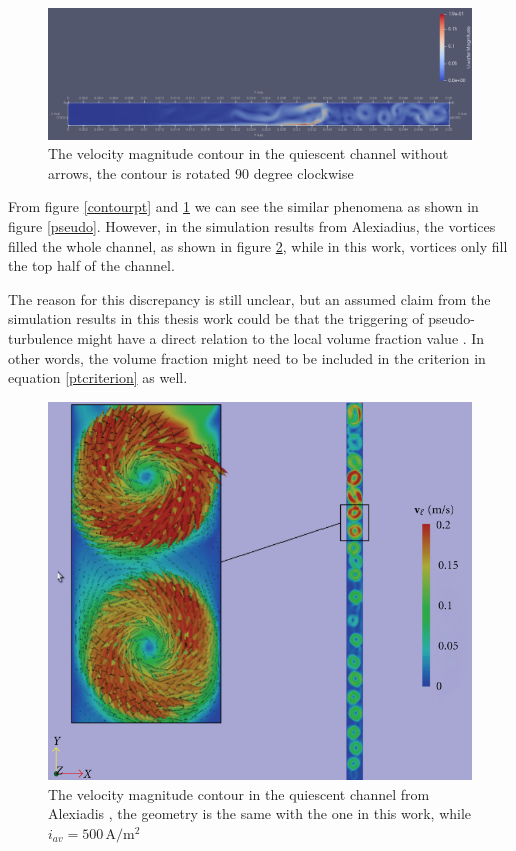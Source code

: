 \begin{figure}[H]
    \centering
    \includegraphics[width=\textwidth]{velocitywithoutarrow.png}
    \caption{The velocity magnitude contour in the quiescent channel without arrows, the contour is rotated 90 degree clockwise}
    \label{contourptnoarrow}
\end{figure}


From figure \ref{contourpt} and \ref{contourptnoarrow} we can see the similar phenomena as shown in figure \ref{pseudo}. However, in the simulation results from Alexiadius, the vortices filled the whole channel, as shown in figure \ref{pseudoalex}, while in this work, vortices only fill the top half of the channel. 

The reason for this discrepancy is still unclear, but an assumed claim from the simulation results in this thesis work could be that the triggering of pseudo-turbulence might have a direct relation to the local volume fraction value \cite{Boissonneau2000}. In other words, the volume fraction might need to be included in the criterion in equation \ref{ptcriterion} as well.

\begin{figure}[H]
    \centering
    \includegraphics[width=\textwidth]{pseudoalex.png}
    \caption{The velocity magnitude contour in the quiescent channel from Alexiadis \cite{Alexiadis2012a}, the geometry is the same with the one in this work, while $i_{av} = 500 \, \mathrm{A/m^2}$}
    \label{pseudoalex}
\end{figure}

